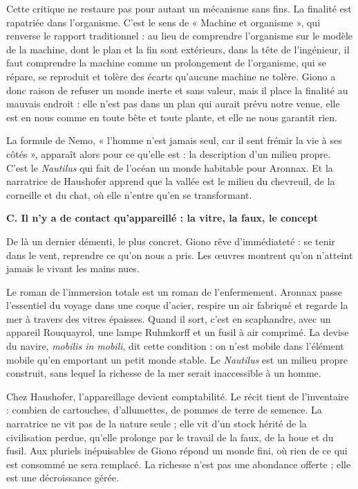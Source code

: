 \documentclass[11pt,a4paper]{article}
\begin{document}
Cette critique ne restaure pas pour autant un mécanisme sans fins. La finalité est rapatriée dans l'organisme. C'est le sens de « Machine et organisme », qui renverse le rapport traditionnel : au lieu de comprendre l'organisme sur le modèle de la machine, dont le plan et la fin sont extérieurs, dans la tête de l'ingénieur, il faut comprendre la machine comme un prolongement de l'organisme, qui se répare, se reproduit et tolère des écarts qu'aucune machine ne tolère. Giono a donc raison de refuser un monde inerte et sans valeur, mais il place la finalité au mauvais endroit : elle n'est pas dans un plan qui aurait prévu notre venue, elle est en nous comme en toute bête et toute plante, et elle ne nous garantit rien.

La formule de Nemo, « l'homme n'est jamais seul, car il sent frémir la vie à ses côtés », apparaît alors pour ce qu'elle est : la description d'un milieu propre. C'est le \emph{Nautilus} qui fait de l'océan un monde habitable pour Aronnax. Et la narratrice de Haushofer apprend que la vallée est le milieu du chevreuil, de la corneille et du chat, où elle n'entre qu'en se transformant.

\textbf{C. Il n'y a de contact qu'appareillé : la vitre, la faux, le concept}

De là un dernier démenti, le plus concret. Giono rêve d'immédiateté : se tenir dans le vent, reprendre ce qu'on nous a pris. Les œuvres montrent qu'on n'atteint jamais le vivant les mains nues.

Le roman de l'immersion totale est un roman de l'enfermement. Aronnax passe l'essentiel du voyage dans une coque d'acier, respire un air fabriqué et regarde la mer à travers des vitres épaisses. Quand il sort, c'est en scaphandre, avec un appareil Rouquayrol, une lampe Ruhmkorff et un fusil à air comprimé. La devise du navire, \emph{mobilis in mobili}, dit cette condition : on n'est mobile dans l'élément mobile qu'en emportant un petit monde stable. Le \emph{Nautilus} est un milieu propre construit, sans lequel la richesse de la mer serait inaccessible à un homme.

Chez Haushofer, l'appareillage devient comptabilité. Le récit tient de l'inventaire : combien de cartouches, d'allumettes, de pommes de terre de semence. La narratrice ne vit pas de la nature seule ; elle vit d'un stock hérité de la civilisation perdue, qu'elle prolonge par le travail de la faux, de la houe et du fusil. Aux pluriels inépuisables de Giono répond un monde fini, où rien de ce qui est consommé ne sera remplacé. La richesse n'est pas une abondance offerte ; elle est une décroissance gérée.
\end{document}
